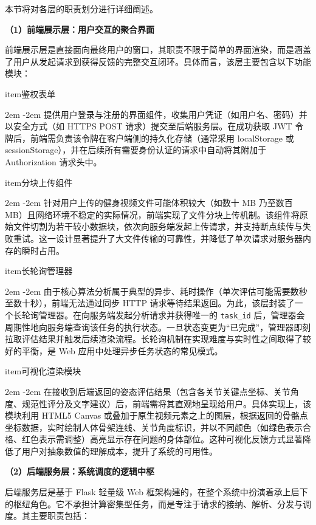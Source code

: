 \documentclass[UTF8,twoside]{ctexrep}
\makeatletter
\def@NAT@last@yr{\@citea}%
\def@NAT@last@yr{-\NAT@penalty}%
\newcommand{\listbodyaligntext}[1]{%
  \par\begingroup
    \parindent=0pt
    \parshape=2 2em \dimexpr\textwidth-2em\relax 0pt \textwidth
    \noindent\ignorespaces#1\unskip\par
  \endgroup
}
\newcommand{\researchitem}[2]{%
  \csname item\endcsname #1%
  \listbodyaligntext{#2}%
}
\makeatother
\begin{document}
本节将对各层的职责划分进行详细阐述。

\textbf{（1）前端展示层：用户交互的聚合界面}

前端展示层是直接面向最终用户的窗口，其职责不限于简单的界面渲染，而是涵盖了用户从发起请求到获得反馈的完整交互闭环。具体而言，该层主要包含以下功能模块：

\begin{researchlist}
  
\researchitem{鉴权表单}{
    提供用户登录与注册的界面组件，收集用户凭证（如用户名、密码）并以安全方式（如 HTTPS POST 请求）提交至后端服务层。在成功获取 JWT 令牌后，前端需负责该令牌在客户端侧的持久化存储（通常采用 localStorage 或 sessionStorage），并在后续所有需要身份认证的请求中自动将其附加于 Authorization 请求头中。
  }

  
\researchitem{分块上传组件}{
    针对用户上传的健身视频文件可能体积较大（如数十 MB 乃至数百 MB）且网络环境不稳定的实际情况，前端实现了文件分块上传机制。该组件将原始文件切割为若干较小数据块，依次向服务端发起上传请求，并支持断点续传与失败重试。这一设计显著提升了大文件传输的可靠性，并降低了单次请求对服务器内存的瞬时占用。
  }

  
\researchitem{长轮询管理器}{
    由于核心算法分析属于典型的异步、耗时操作（单次评估可能需要数秒至数十秒），前端无法通过同步 HTTP 请求等待结果返回。为此，该层封装了一个长轮询管理器。在向服务端发起分析请求并获得唯一的 \texttt{task\_id} 后，管理器会周期性地向服务端查询该任务的执行状态。一旦状态变更为“已完成”，管理器即刻拉取评估结果并触发后续渲染流程。长轮询机制在实现难度与实时性之间取得了较好的平衡，是 Web 应用中处理异步任务状态的常见模式。
  }

  
\researchitem{可视化渲染模块}{
    在接收到后端返回的姿态评估结果（包含各关节关键点坐标、关节角度、规范性评分及文字建议）后，前端需将其直观地呈现给用户。具体实现上，该模块利用 HTML5 Canvas 或叠加于原生视频元素之上的图层，根据返回的骨骼点坐标数据，实时绘制人体骨架连线、关节角度标识，并以不同颜色（如绿色表示合格、红色表示需调整）高亮显示存在问题的身体部位。这种可视化反馈方式显著降低了用户对抽象数值的理解成本，提升了系统的可用性。
  }
\end{researchlist}

\textbf{（2）后端服务层：系统调度的逻辑中枢}

后端服务层是基于 Flask 轻量级 Web 框架构建的，在整个系统中扮演着承上启下的枢纽角色。它不承担计算密集型任务，而是专注于请求的接纳、解析、分发与调度。其主要职责包括：
\end{document}
